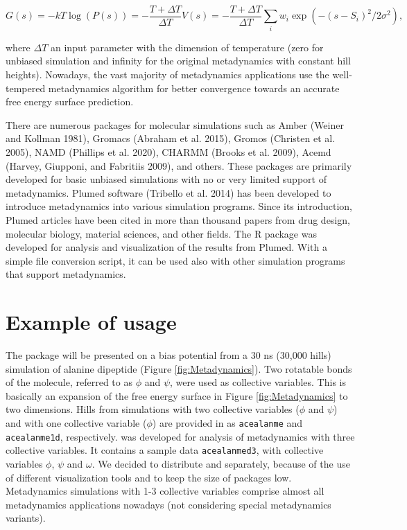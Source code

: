 \begin{equation}
G(s) = -kT \log(P(s)) = - \frac{T + \Delta T}{\Delta T} V(s) =
- \frac{T + \Delta T}{\Delta T} \sum_i w_i \exp(-(s-S_i)^2/{2 \sigma^2}),
\label{eq:wtmtd}
\end{equation}

where \(\Delta T\) an input parameter with the dimension of temperature
(zero for unbiased simulation and infinity for the original metadynamics with constant
hill heights). Nowadays, the vast majority of metadynamics applications use the
well-tempered metadynamics algorithm for better convergence towards an accurate
free energy surface prediction.

There are numerous packages for molecular simulations such as Amber (Weiner and Kollman 1981),
Gromacs (Abraham et al. 2015), Gromos (Christen et al. 2005), NAMD (Phillips et al. 2020),
CHARMM (Brooks et al. 2009), Acemd (Harvey, Giupponi, and Fabritiis 2009), and others.
These packages are primarily developed for basic unbiased simulations with no or very
limited support of metadynamics. Plumed software (Tribello et al. 2014) has been developed to
introduce metadynamics into various simulation programs. Since its introduction,
Plumed articles have been cited in more than thousand papers from drug design,
molecular biology, material sciences, and other fields. The R package 
was developed for analysis and visualization of the results from Plumed. With
a simple file conversion script, it can be used also with other simulation
programs that support metadynamics.

\hypertarget{example-of-usage}{%
\section{Example of usage}\label{example-of-usage}}

The package  will be presented on a bias potential from a
30 ns (30,000 hills) simulation of alanine dipeptide (Figure \ref{fig:Metadynamics}).
Two rotatable bonds of the molecule, referred to as \(\phi\) and \(\psi\),
were used as collective variables. This is basically an expansion of the free energy
surface in Figure \ref{fig:Metadynamics} to two dimensions.
Hills from simulations with two collective variables (\(\phi\) and \(\psi\)) and with
one collective variable (\(\phi\)) are provided in  as
\texttt{acealanme} and \texttt{acealanme1d}, respectively.  was developed
for analysis of metadynamics with three collective variables. It contains a sample
data \texttt{acealanmed3}, with collective variables \(\phi\), \(\psi\) and \(\omega\).
We decided to distribute  and  separately, because of
the use of different visualization tools and to keep the size of packages low.
Metadynamics simulations with 1-3 collective variables comprise almost all metadynamics
applications nowadays (not considering special metadynamics variants).

